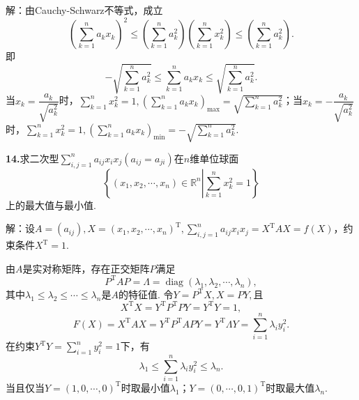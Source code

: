 \documentclass[12pt, a4paper]{article}
\newcommand{\RR}{\mathbb{R}}
\begin{document}
解：由Cauchy-Schwarz不等式，成立
\[\left(\sum_{k = 1}^{n} a_k x_k\right)^2 \leq \left(\sum_{k = 1}^{n} a_k^2\right)\left(\sum_{k = 1}^{n} x_k^2\right) \leq \left(\sum_{k = 1}^{n} a_k^2\right).\]
即
\[-\sqrt{\sum_{k = 1}^{n} a_k^2} \leq \sum_{k = 1}^{n} a_k x_k \leq \sqrt{\sum_{k = 1}^{n} a_k^2}.\]
当\(x_k = \dfrac{a_k}{\sqrt{a_k^2}}\)时，\(\sum\limits_{k = 1}^{n} x_k^2 = 1, \left(\sum\limits_{k = 1}^{n} a_k x_k\right)_{\text{max}} = \sqrt{\sum\limits_{k = 1}^{n} a_k^2}\)；当\(x_k = -\dfrac{a_k}{\sqrt{a_k^2}}\)时，\(\sum\limits_{k = 1}^{n} x_k^2 = 1, \left(\sum\limits_{k = 1}^{n} a_k x_k\right)_{\text{min}} = -\sqrt{\sum\limits_{k = 1}^{n} a_k^2}\).

\textbf{14.}求二次型\(\sum_{i, j = 1}^{n} a_{ij}x_ix_j(a_{ij} = a_{ji})\)在\(n\)维单位球面
\[\left\{(x_1, x_2, \cdots, x_n) \in \RR^n \left|\sum_{k = 1}^{n} x_k^2 = 1\right.\right\}\]
上的最大值与最小值.

解：设\(A = (a_{ij}), X = (x_1, x_2, \cdots, x_n)^\mathrm{T}, \sum_{i, j = 1}^{n} a_{ij}x_ix_j = X^\mathrm{T}AX = f(X)\)，约束条件\(X^\mathrm{T} = 1\).

由\(A\)是实对称矩阵，存在正交矩阵\(P\)满足
\[P^\mathrm{T}AP = \Lambda = \operatorname{diag}(\lambda_1, \lambda_2, \cdots, \lambda_n),\]
其中\(\lambda_1 \leq \lambda_2 \leq \cdots \leq \lambda_n\)是\(A\)的特征值.
令\(Y = P^\mathrm{T}X, X = PY,\)且
\[X^\mathrm{T}X = Y^\mathrm{T}P^\mathrm{T}PY = Y^\mathrm{T}Y = 1,\]
\[F(X) = X^\mathrm{T}AX = Y^\mathrm{T}P^\mathrm{T}APY = Y^\mathrm{T}\Lambda Y = \sum_{i = 1}^{n} \lambda_i y_i^2.\]
在约束\(Y^\mathrm{T}Y = \sum_{i = 1}^{n} y_i^2 = 1\)下，有
\[\lambda_1 \leq  \sum_{i = 1}^{n} \lambda_i y_i^2 \leq \lambda_n.\]
当且仅当\(Y = (1, 0, \cdots, 0)^\mathrm{T}\)时取最小值\(\lambda_1\)；\(Y = (0, \cdots, 0, 1)^\mathrm{T}\)时取最大值\(\lambda_n\).
\end{document}

